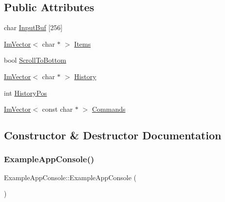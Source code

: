 \subsection*{Public Attributes}
\begin{DoxyCompactItemize}
\item 
char \hyperlink{struct_example_app_console_ab30accde81ae6833bd2ecf35f43f01ab}{Input\+Buf} \mbox{[}256\mbox{]}
\item 
\hyperlink{class_im_vector}{Im\+Vector}$<$ char $\ast$ $>$ \hyperlink{struct_example_app_console_acfde7d45fb733ac72d5d500168557b36}{Items}
\item 
bool \hyperlink{struct_example_app_console_a69b1406795fd71a3757761b0767ea1c5}{Scroll\+To\+Bottom}
\item 
\hyperlink{class_im_vector}{Im\+Vector}$<$ char $\ast$ $>$ \hyperlink{struct_example_app_console_a11c7fa54e744288f3606e4d6521d6345}{History}
\item 
int \hyperlink{struct_example_app_console_a2508db0a7d205947cea65b141d4ed589}{History\+Pos}
\item 
\hyperlink{class_im_vector}{Im\+Vector}$<$ const char $\ast$ $>$ \hyperlink{struct_example_app_console_a1eebee69cceb0345cf9d9b6e6beb9d03}{Commands}
\end{DoxyCompactItemize}


\subsection{Constructor \& Destructor Documentation}
\hypertarget{struct_example_app_console_a405521e6aa8f97954b67315baf8d6147}{}\label{struct_example_app_console_a405521e6aa8f97954b67315baf8d6147} 
\subsubsection{\texorpdfstring{Example\+App\+Console()}{ExampleAppConsole()}}
{\footnotesize\ttfamily Example\+App\+Console\+::\+Example\+App\+Console (\begin{DoxyParamCaption}{ }\end{DoxyParamCaption})}

\hypertarget{struct_example_app_console_a91ef200056f867cf97a57db91bb991c4}{}\label{struct_example_app_console_a91ef200056f867cf97a57db91bb991c4} 
